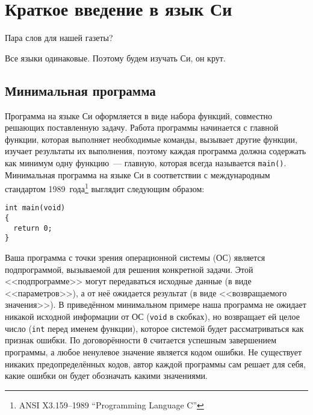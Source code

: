 \chapter{Краткое введение в язык Си}

Пара слов для нашей газеты?

Все языки одинаковые. Поэтому будем изучать Си, он крут.


\section{Минимальная программа}

Программа на языке Си оформляется в виде набора функций, совместно решающих
поставленную задачу. Работа программы начинается с главной функции, которая
выполняет необходимые команды, вызывает другие функции, изучает результаты их
выполнения, поэтому каждая программа должна содержать как минимум одну
функцию~--- главную, которая всегда называется \texttt{main()}. Минимальная
программа на языке Си в соответствии с международным стандартом
1989~года\footnote{ANSI X3.159--1989 ``Programming Language C''} выглядит
следующим образом:

\begin{verbatim}
int main(void)
{
  return 0;
}
\end{verbatim}

Ваша программа с точки зрения операционной системы (ОС) является
подпрограммой, вызываемой для решения конкретной задачи. Этой <<подпрограмме>>
могут передаваться исходные данные (в виде <<параметров>>), а от неё ожидается
результат (в виде <<возвращаемого значения>>). В приведённом минимальном
примере наша программа не ожидает никакой исходной информации от ОС
(\texttt{void} в скобках), но возвращает ей целое число (\texttt{int} перед
именем функции), которое системой будет рассматриваться как признак ошибки. По
договорённости \texttt{0} считается успешным завершением программы, а любое
ненулевое значение является кодом ошибки. Не существует никаких
предопределённых кодов, автор каждой программы сам решает для себя, какие
ошибки он будет обозначать какими значениями.


